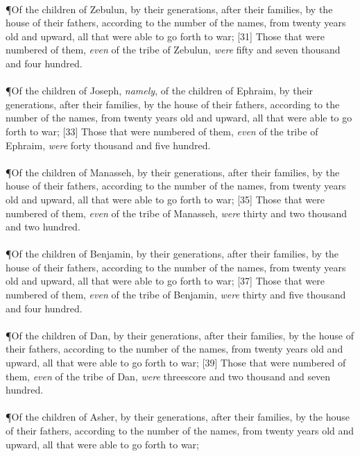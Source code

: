 \\
\P \textcolor[cmyk]{0.99998,1,0,0}{Of the children of Zebulun, by their generations, after their families, by the house of their fathers, according to the number of the names, from twenty years old and upward, all that were able to go forth to war;}
[31] \textcolor[cmyk]{0.99998,1,0,0}{Those that were numbered of them, \emph{even} of the tribe of Zebulun, \emph{were} fifty and seven thousand and four hundred.}\\
\\
\P \textcolor[cmyk]{0.99998,1,0,0}{Of the children of Joseph, \emph{namely}, of the children of Ephraim, by their generations, after their families, by the house of their fathers, according to the number of the names, from twenty years old and upward, all that were able to go forth to war;}
[33] \textcolor[cmyk]{0.99998,1,0,0}{Those that were numbered of them, \emph{even} of the tribe of Ephraim, \emph{were} forty thousand and five hundred.}\\
\\
\P \textcolor[cmyk]{0.99998,1,0,0}{Of the children of Manasseh, by their generations, after their families, by the house of their fathers, according to the number of the names, from twenty years old and upward, all that were able to go forth to war;}
[35] \textcolor[cmyk]{0.99998,1,0,0}{Those that were numbered of them, \emph{even} of the tribe of Manasseh, \emph{were} thirty and two thousand and two hundred.}\\
\\
\P \textcolor[cmyk]{0.99998,1,0,0}{Of the children of Benjamin, by their generations, after their families, by the house of their fathers, according to the number of the names, from twenty years old and upward, all that were able to go forth to war;}
[37] \textcolor[cmyk]{0.99998,1,0,0}{Those that were numbered of them, \emph{even} of the tribe of Benjamin, \emph{were} thirty and five thousand and four hundred. }\\
\\
\P \textcolor[cmyk]{0.99998,1,0,0}{Of the children of Dan, by their generations, after their families, by the house of their fathers, according to the number of the names, from twenty years old and upward, all that were able to go forth to war;}
[39] \textcolor[cmyk]{0.99998,1,0,0}{Those that were numbered of them, \emph{even} of the tribe of Dan, \emph{were} threescore and two thousand and seven hundred.}\\
\\
\P \textcolor[cmyk]{0.99998,1,0,0}{Of the children of Asher, by their generations, after their families, by the house of their fathers, according to the number of the names, from twenty years old and upward, all that were able to go forth to war;}
